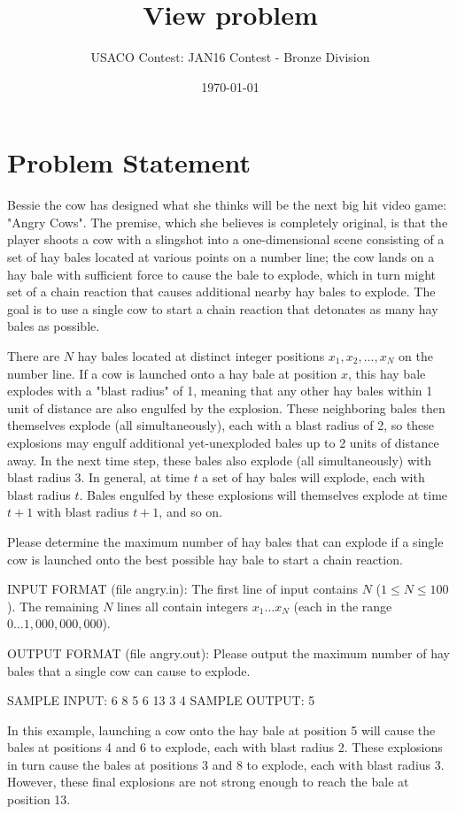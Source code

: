 \documentclass[12pt]{article}
\title{View problem}
\author{USACO Contest: JAN16 Contest - Bronze Division}
\date{\today}
\begin{document}
\maketitle

\section*{Problem Statement}

Bessie the cow has designed what she thinks will be the next big hit video game:
"Angry Cows".  The premise, which she believes is completely original, is that
the player shoots a cow with a slingshot  into a one-dimensional scene
consisting of a set of hay bales located at various points on a number line; the
cow lands on a hay bale with sufficient force to cause the bale to explode,
which in turn might set of a chain reaction that causes  additional nearby hay
bales to explode.  The goal is to use a single cow to start a chain reaction
that detonates as many hay bales as possible.

There are $N$ hay bales located at distinct integer positions
$x_1, x_2, \ldots, x_N$ on the number line.  If a cow is launched onto a hay
bale at position $x$, this hay bale explodes with a "blast radius" of 1, meaning
that any other hay bales within 1 unit of distance are also engulfed by the
explosion. These neighboring bales then themselves explode (all simultaneously),
each with a blast radius of 2, so these explosions may engulf additional
yet-unexploded bales up to 2 units of distance away.  In the next time step,
these bales also  explode (all simultaneously) with blast radius 3.  In general,
at time $t$ a  set of hay bales will explode, each with blast radius $t$.  Bales
engulfed by these explosions will themselves explode at time $t+1$ with blast
radius $t+1$, and so on.

Please determine the maximum number of hay bales that can explode if a single
cow is launched onto the best possible hay bale to start a chain reaction.

INPUT FORMAT (file angry.in):
The first line of input contains $N$ ($1 \leq N \leq 100$).  The remaining $N$
lines all  contain integers $x_1 \ldots x_N$ (each in the range
$0 \ldots 1,000,000,000$).

OUTPUT FORMAT (file angry.out):
Please output the maximum number of hay bales that a single cow can cause to
explode.

SAMPLE INPUT:
6
8
5
6
13
3
4
SAMPLE OUTPUT: 
5

In this example, launching a cow onto the hay bale at position 5 will cause the
bales at positions 4 and 6 to explode, each with blast radius 2.  These
explosions in turn cause the bales at positions 3 and 8 to explode, each with
blast radius 3.   However, these final explosions are not strong enough to reach
the bale at position 13.
\end{document}
